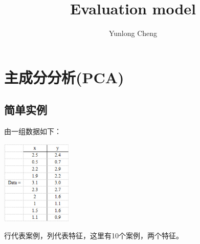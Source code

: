 \documentclass[12pt,a4paper]{article}
\title{Evaluation model}
\author{Yunlong Cheng}
\begin{document}
\maketitle
\section{主成分分析(PCA)}
\subsection{简单实例}
由一组数据如下：
\begin{center}
  \includegraphics[width = 0.25\textwidth]{figures/simple_data.png}
\end{center}
行代表案例，列代表特征，这里有10个案例，两个特征。
\end{document}
